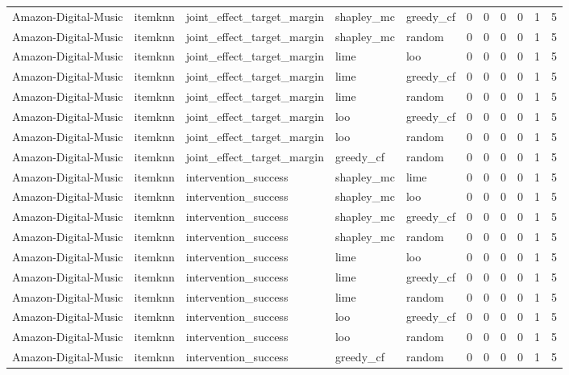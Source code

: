 \begin{table}[t]
{\begin{tabular}{lllllrrrrrr}
Amazon-Digital-Music & itemknn & joint\_effect\_target\_margin & shapley\_mc & greedy\_cf & 0 & 0 & 0 & 0 & 1 & 5 \\
Amazon-Digital-Music & itemknn & joint\_effect\_target\_margin & shapley\_mc & random & 0 & 0 & 0 & 0 & 1 & 5 \\
Amazon-Digital-Music & itemknn & joint\_effect\_target\_margin & lime & loo & 0 & 0 & 0 & 0 & 1 & 5 \\
Amazon-Digital-Music & itemknn & joint\_effect\_target\_margin & lime & greedy\_cf & 0 & 0 & 0 & 0 & 1 & 5 \\
Amazon-Digital-Music & itemknn & joint\_effect\_target\_margin & lime & random & 0 & 0 & 0 & 0 & 1 & 5 \\
Amazon-Digital-Music & itemknn & joint\_effect\_target\_margin & loo & greedy\_cf & 0 & 0 & 0 & 0 & 1 & 5 \\
Amazon-Digital-Music & itemknn & joint\_effect\_target\_margin & loo & random & 0 & 0 & 0 & 0 & 1 & 5 \\
Amazon-Digital-Music & itemknn & joint\_effect\_target\_margin & greedy\_cf & random & 0 & 0 & 0 & 0 & 1 & 5 \\
Amazon-Digital-Music & itemknn & intervention\_success & shapley\_mc & lime & 0 & 0 & 0 & 0 & 1 & 5 \\
Amazon-Digital-Music & itemknn & intervention\_success & shapley\_mc & loo & 0 & 0 & 0 & 0 & 1 & 5 \\
Amazon-Digital-Music & itemknn & intervention\_success & shapley\_mc & greedy\_cf & 0 & 0 & 0 & 0 & 1 & 5 \\
Amazon-Digital-Music & itemknn & intervention\_success & shapley\_mc & random & 0 & 0 & 0 & 0 & 1 & 5 \\
Amazon-Digital-Music & itemknn & intervention\_success & lime & loo & 0 & 0 & 0 & 0 & 1 & 5 \\
Amazon-Digital-Music & itemknn & intervention\_success & lime & greedy\_cf & 0 & 0 & 0 & 0 & 1 & 5 \\
Amazon-Digital-Music & itemknn & intervention\_success & lime & random & 0 & 0 & 0 & 0 & 1 & 5 \\
Amazon-Digital-Music & itemknn & intervention\_success & loo & greedy\_cf & 0 & 0 & 0 & 0 & 1 & 5 \\
Amazon-Digital-Music & itemknn & intervention\_success & loo & random & 0 & 0 & 0 & 0 & 1 & 5 \\
Amazon-Digital-Music & itemknn & intervention\_success & greedy\_cf & random & 0 & 0 & 0 & 0 & 1 & 5 \\

\end{tabular}}
\end{table}

